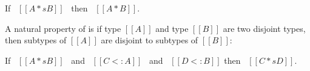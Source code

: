 \begin{lemma}
  If \ $[[A *s B]]$ \ then \ $[[A * B]]$.
\label{lemma:union:disj-complete}
\end{lemma}

\begin{comment}
\begin{proof}
  By induction on type A.
  \begin{itemize}
    \item Case $[[Top]]$ requires \Cref{lemma:union:bl-disj}.
    \item Case $[[Bot]]$ is trivial to prove.
    \item Case $[[Int]]$ requires induction on type B and
          \Cref{lemma:union:bl-disj,lemma:union:disj-sym}.
    \item Case $[[A -> B]]$ requires induction on type B and \Cref{lemma:union:disj-sym}.
    \item Case $[[A \/ B]]$ follows directly from inductive hypothesis.
  \end{itemize}
\end{proof}
\end{comment}


\begin{comment}
\begin{lemma}[Bottom-Like Disjoint]
  If \ $[[botlike A]]$ \ then \ $[[A * B]]$.
\label{lemma:union:bl-disjoint}
\end{lemma}
\end{comment}

\noindent A natural property of \cal is
if type $[[A]]$ and type $[[B]]$ are two disjoint types, then subtypes
of $[[A]]$ are disjoint to subtypes of $[[B]]$:

\begin{lemma}
  If \ $[[A *s B]]$ \ and \ $[[C <: A]]$ \ and \ $[[D <: B]]$  then \ $[[C *s D]]$.
\label{lemma:union:disj-sub}
\end{lemma}



